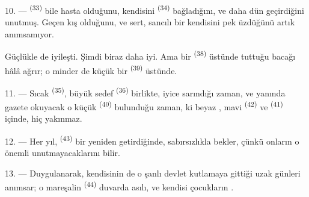 \VUsaut{4.2mm}
\VUsaut{3.0mm}

10. ---  \textsuperscript{(33)} bile hasta olduğunu,
 kendisini  \textsuperscript{(34)}
bağladığını, ve daha dün  geçirdiğini unutmuş.
Geçen kış  olduğunu, ve sert, sancılı bir 
kendisini pek üzdüğünü artık anımsamıyor.

Güçlükle de iyileşti. Şimdi biraz daha iyi. Ama bir 
\textsuperscript{(38)} üstünde tuttuğu bacağı hâlâ ağrır; o minder de küçük bir
 \textsuperscript{(39)} üstünde.

11. --- Sıcak  \textsuperscript{(35)}, büyük sedef
 \textsuperscript{(36)} birlikte, iyice sarındığı zaman, ve
yanında
gazete okuyacak o küçük  \textsuperscript{(40)} bulunduğu
zaman, ki beyaz , mavi 
\textsuperscript{(42)} ve  \textsuperscript{(41)}
içinde, hiç yakınmaz.

12. --- Her yıl,  \textsuperscript{(43)} bir 
 yeniden getirdiğinde,  sabırsızlıkla
bekler, çünkü onların o önemli  unutmayacaklarını bilir.

13. --- Duygulanarak, kendisinin de o şanlı devlet 
kutlamaya gittiği uzak günleri anımsar; o mareşalin 
\textsuperscript{(44)} duvarda asılı, ve kendisi çocukların
.
\VUsaut{6.0mm}
\VUfilet{22mm}
